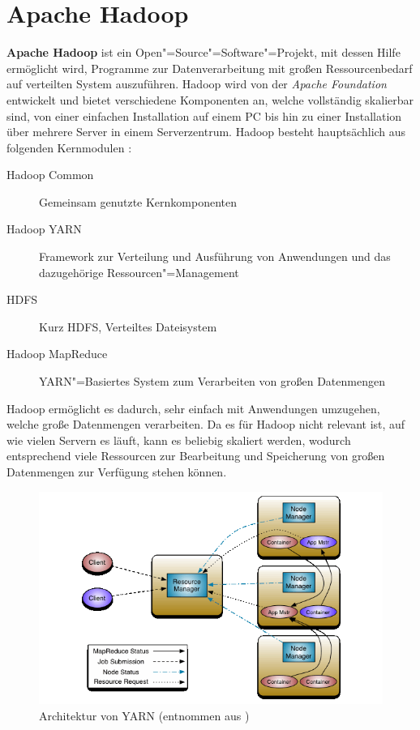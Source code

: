 \section{Apache Hadoop}\label{sec:hadoop}

\textbf{Apache Hadoop} ist ein Open"=Source"=Software"=Projekt, mit dessen Hilfe ermöglicht wird, Programme zur Datenverarbeitung mit großen Ressourcenbedarf auf verteilten System auszuführen.
Hadoop wird von der \emph{Apache Foundation} entwickelt und bietet verschiedene Komponenten an, welche vollständig skalierbar sind, von einer einfachen Installation auf einem PC bis hin zu einer Installation über mehrere Server in einem Serverzentrum.
Hadoop besteht hauptsächlich aus folgenden Kernmodulen \cite{HadoopHomePage}:

\begin{description}
	\item[Hadoop Common] Gemeinsam genutzte Kernkomponenten
	\item[Hadoop YARN] Framework zur Verteilung und Ausführung von Anwendungen und das dazugehörige Ressourcen"=Management
	\item[\acl{HDFS}] Kurz \acs{HDFS}, Verteiltes Dateisystem
	\item[Hadoop MapReduce] YARN"=Basiertes System zum Verarbeiten von großen Datenmengen
\end{description}

Hadoop ermöglicht es dadurch, sehr einfach mit Anwendungen umzugehen, welche große Datenmengen verarbeiten.
Da es für Hadoop nicht relevant ist, auf wie vielen Servern es läuft, kann es beliebig skaliert werden, wodurch entsprechend viele Ressourcen zur Bearbeitung und Speicherung von großen Datenmengen zur Verfügung stehen können.

\begin{figure}
	\includegraphics{./images/yarn_architecture.png}
	\caption[Architektur von YARN]{Architektur von YARN (entnommen aus \cite{HadoopYarnArch271})}
	\label{fig:yarnarch}
\end{figure}

